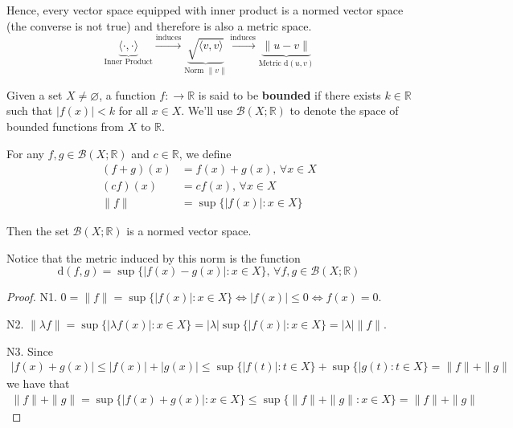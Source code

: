 Hence, every vector space equipped with inner product is a normed vector space (the converse is not true) and therefore is also a metric space.
\[
	\underbrace{\langle \cdot, \cdot \rangle}_\text{Inner Product} \xrightarrow{\text{induces}}  \underbrace{\sqrt{\langle v, v \rangle}}_{\text{Norm } \| v \|} \xrightarrow{\text{induces}} \underbrace{\| u - v \|}_{\text{Metric } \mathrm{d}(u,v)}
\]

\begin{proposition}\label{bdd-real-fun}
	Given a set $X \neq \varnothing$, a function $f : \longrightarrow \mathbb{R}$ is said to be \textbf{bounded} if there exists $k \in \mathbb{R}$ such that $|f(x)| < k$ for all $x \in X$. We'll use $\mathcal{B}(X; \mathbb{R})$ to denote the space of bounded functions from $X$ to $\mathbb{R}$.
	
	For any $f, g \in \mathcal{B}(X; \mathbb{R})$ and $c \in \mathbb{R}$, we define
	\begin{equation*}
		\begin{aligned}
			(f+g)(x) &= f(x) + g(x), \, \forall x \in X \\
			(cf)(x)  &= cf(x), \, \forall x \in X \\
			\| f \|  &= \sup \{|f(x)| : x \in X \}
		\end{aligned}
	\end{equation*}
	
	Then the set $\mathcal{B}(X; \mathbb{R})$ is a normed vector space.
	
	Notice that the metric induced by this norm is the function
\[
	\mathrm{d}(f,g) = \sup \{ |f(x) - g(x)| : x \in X \}, \, \forall f, g \in \mathcal{B}(X; \mathbb{R})
\]
\end{proposition}

\begin{proof}
	N1. $0 = \| f \| = \sup \{ |f(x)| : x \in X \} \iff |f(x)| \leq 0 \iff f(x) = 0$.
	
	N2. $\| \lambda f \| = \sup \{ |\lambda f(x)| : x \in X \} = |\lambda| \sup \{|f(x)| : x \in X \} = |\lambda| \| f \|$.
	
	N3. Since
	\begin{equation*}
		\begin{aligned}
			|f(x) + g(x)| \leq |f(x)| + |g(x)| \leq \sup \{ |f(t)| : t \in X \} + \sup \{ |g(t) : t \in X \} 
			= \|f\| + \| g \|
		\end{aligned}
	\end{equation*}
	we have that
	\begin{equation*}
		\begin{aligned}
			\|f\| + \| g \| = \sup \{ |f(x) + g(x)| : x \in X \} \leq \sup \{ \|f\| + \| g \| : x \in X \} 
			= \|f\| + \| g \|
		\end{aligned}
	\end{equation*}
\end{proof}

